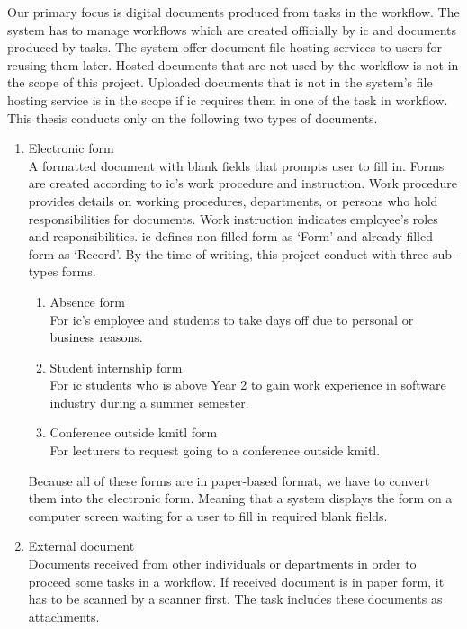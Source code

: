 Our primary focus is digital documents produced from tasks in the workflow.
The system has to manage workflows which are created officially by \gls{ic} and documents produced by tasks.
The system offer document file hosting services to users for reusing them later.
Hosted documents that are not used by the workflow is not in the scope of this project.
Uploaded documents that is not in the system's file hosting service is in the scope if \gls{ic} requires them in one of the task in workflow.
This thesis conducts only on the following two types of documents.
\begin{enumerate}
\item Electronic form \hfill \\
A formatted document with blank fields that prompts user to fill in.
Forms are created according to \gls{ic}'s work procedure and instruction.
Work procedure provides details on working procedures, departments, or persons who hold responsibilities for documents.
Work instruction indicates employee's roles and responsibilities.
\gls{ic} defines non-filled form as \enquote*{Form} and already filled form as \enquote*{Record}.
By the time of writing, this project conduct with three sub-types forms.
\begin{enumerate}
\item Absence form \hfill \\
For \gls{ic}'s employee and students to take days off due to personal or business reasons.
\item Student internship form \hfill \\
For \gls{ic} students who is above Year 2 to gain work experience in software industry during a summer semester.
\item Conference outside \gls{kmitl} form \hfill \\
For lecturers to request going to a conference outside \gls{kmitl}.
\end{enumerate}
Because all of these forms are in paper-based format, we have to convert them into the electronic form.
Meaning that a system displays the form on a computer screen waiting for a user to fill in required blank fields.
\item External document \hfill \\
Documents received from other individuals or departments in order to proceed some tasks in a workflow.
If received document is in paper form, it has to be scanned by a scanner first.
The task includes these documents as attachments.
\end{enumerate}

